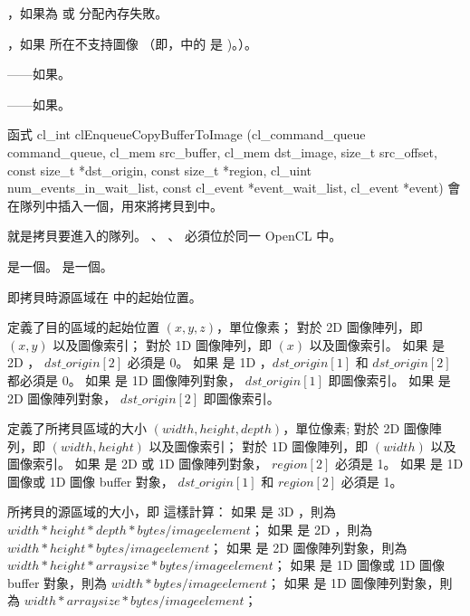 \item {}，如果為  或  分配內存失敗。

\item {}，如果  所在不支持圖像
（即，中的  是 )。）。

\item {}——如果\scdevfailres。
\item {}——如果\schostfailres。
\stopigBase

函式
\startclc
cl_int clEnqueueCopyBufferToImage (cl_command_queue command_queue,
			cl_mem src_buffer,
			cl_mem dst_image,
			size_t src_offset,
			const size_t *dst_origin,
			const size_t *region,
			cl_uint num_events_in_wait_list,
			const cl_event *event_wait_list,
			cl_event *event)
\stopclc
會在隊列中插入一個，用來將拷貝到中。

 就是拷貝要進入的隊列。
、 、  必須位於同一 OpenCL 中。

 是一個。
 是一個。

 即拷貝時源區域在  中的起始位置。

 定義了目的區域的起始位置 $(x, y, z)$，單位像素；
對於 2D 圖像陣列，即 $(x, y)$ 以及圖像索引；
對於 1D 圖像陣列，即 $(x)$ 以及圖像索引。
如果  是 2D ， $dst\_origin[2]$ 必須是 0。
如果  是 1D ，$dst\_origin[1]$ 和 $dst\_origin[2]$ 都必須是 0。
如果  是 1D 圖像陣列對象， $dst\_origin[1]$ 即圖像索引。
如果  是 2D 圖像陣列對象， $dst\_origin[2]$ 即圖像索引。

 定義了所拷貝區域的大小 $(width, height, depth)$，單位像素;
對於 2D 圖像陣列，即 $(width, height)$ 以及圖像索引；
對於 1D 圖像陣列，即 $(width)$ 以及圖像索引。
如果  是 2D  或 1D 圖像陣列對象， $region[2]$ 必須是 1。
如果  是 1D 圖像或 1D 圖像 buffer 對象， $dst\_origin[1]$ 和 $region[2]$ 必須是 1。

所拷貝的源區域的大小，即  這樣計算：
如果  是 3D ，則為 $width * height * depth * bytes/image element$；
如果  是 2D ，則為 $width * height * bytes/image element$；
如果  是 2D 圖像陣列對象，則為 $width * height * arraysize * bytes/image element$；
如果  是 1D 圖像或 1D 圖像 buffer 對象，則為 $width * bytes/image element$；
如果  是 1D 圖像陣列對象，則為 $width * arraysize * bytes/image element$；

